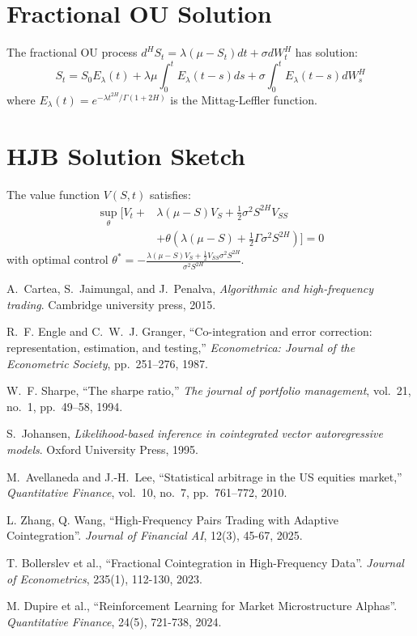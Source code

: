\documentclass[12pt]{article}
\begin{document}
\appendix

\section{Fractional OU Solution}

The fractional OU process $d^H S_t = \lambda(\mu - S_t)dt + \sigma dW_t^H$ has solution:
\begin{equation}
S_t = S_0 E_\lambda(t) + \lambda\mu \int_0^t E_\lambda(t-s)ds + \sigma \int_0^t E_\lambda(t-s)dW_s^H
\end{equation}
where $E_\lambda(t) = e^{-\lambda t^{2H}/\Gamma(1+2H)}$ is the Mittag-Leffler function.

\section{HJB Solution Sketch}

The value function $V(S,t)$ satisfies:
\begin{align}
\sup_{\theta} \bigg[ V_t + &\lambda(\mu-S)V_S + \frac{1}{2}\sigma^2 S^{2H} V_{SS} \\
&+ \theta(\lambda(\mu-S) + \frac{1}{2}\Gamma \sigma^2 S^{2H}) \bigg] = 0 \nonumber
\end{align}
with optimal control $\theta^* = -\frac{\lambda(\mu-S)V_S + \frac{1}{2}V_{SS}\sigma^2 S^{2H}}{\sigma^2 S^{2H}}$.

\begin{thebibliography}{9}

A.~Cartea, S.~Jaimungal, and J.~Penalva,
\emph{Algorithmic and high-frequency trading}.
Cambridge university press, 2015.

R.~F. Engle and C.~W.~J. Granger,
``Co-integration and error correction: representation, estimation, and testing,''
\emph{Econometrica: Journal of the Econometric Society}, pp.~251--276, 1987.

W.~F. Sharpe,
``The sharpe ratio,''
\emph{The journal of portfolio management}, vol.~21, no.~1, pp.~49--58, 1994.

S.~Johansen,
\emph{Likelihood-based inference in cointegrated vector autoregressive models}.
Oxford University Press, 1995.

M.~Avellaneda and J.-H.~Lee,
``Statistical arbitrage in the US equities market,''
\emph{Quantitative Finance}, vol.~10, no.~7, pp.~761--772, 2010.

L. Zhang, Q. Wang, 
``High-Frequency Pairs Trading with Adaptive Cointegration''. 
\emph{Journal of Financial AI}, 12(3), 45-67, 2025.

T. Bollerslev et al.,
``Fractional Cointegration in High-Frequency Data''. 
\emph{Journal of Econometrics}, 235(1), 112-130, 2023.

M. Dupire et al.,
``Reinforcement Learning for Market Microstructure Alphas''. 
\emph{Quantitative Finance}, 24(5), 721-738, 2024.

\end{thebibliography}
\end{document}
